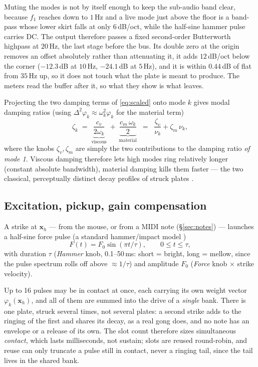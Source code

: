 \documentclass[11pt,a4paper]{article}
\newcommand{\bilap}{\Delta^2}
\begin{document}
Muting the modes is not by itself enough to keep the sub-audio band clear,
because $f_1$ reaches down to $1$\,Hz and a live mode just above the floor
is a band-pass whose lower skirt falls at only $6$\,dB/oct, while the
half-sine hammer pulse carries DC. The output therefore passes a fixed
second-order Butterworth highpass at $20$\,Hz, the last stage before the
bus. Its double zero at the origin removes an offset absolutely rather than
attenuating it, it adds $12$\,dB/oct below the corner ($-12.3$\,dB at
$10$\,Hz, $-24.1$\,dB at $5$\,Hz), and it is within $0.44$\,dB of flat from
$35$\,Hz up, so it does not touch what the plate is meant to produce. The
meters read the buffer after it, so what they show is what leaves.

Projecting the two damping terms of \eqref{eq:scaled} onto mode $k$ gives
modal damping ratios (using $\bilap \varphi_k \approx \omega_k^2 \varphi_k$
for the material term)
%
\begin{equation}
  \zeta_k \;=\; \underbrace{\frac{c_v}{2\omega_k}}_{\text{viscous}}
          \;+\; \underbrace{\frac{c_m\, \omega_k}{2}}_{\text{material}}
  \;\;=\;\; \frac{\zeta_v}{\nu_k} + \zeta_m\, \nu_k ,
  \label{eq:damping}
\end{equation}
%
where the knobs $\zeta_v, \zeta_m$ are simply the two contributions to the
damping ratio \emph{of mode 1}. Viscous damping therefore lets high modes
ring relatively longer (constant absolute bandwidth), material damping
kills them faster --- the two classical, perceptually distinct decay
profiles of struck plates \cite{chaigne,fletcher-rossing}.

\subsection{Excitation, pickup, gain compensation}
\label{sec:excitation}

A strike at $\bm{x}_h$ --- from the mouse, or from a MIDI note
(\S\ref{sec:notes}) --- launches a half-sine force pulse (a standard
hammer/impact model \cite{chaigne})
%
\begin{equation}
  F(t) = F_0 \sin\!\left(\pi t/\tau\right), \qquad 0 \le t \le \tau,
\end{equation}
%
with duration $\tau$ (\emph{Hammer} knob, 0.1--50\,ms: short = bright,
long = mellow, since the pulse spectrum rolls off above $\approx 1/\tau$)
and amplitude $F_0$ (\emph{Force} knob $\times$ strike velocity).

Up to 16 pulses may be in contact at once, each carrying its own weight
vector $\varphi_k(\bm{x}_h)$, and all of them are summed into the drive of
a \emph{single} bank. There is one plate, struck several times, not
several plates: a second strike adds to the ringing of the first and
shares its decay, as a real gong does, and no note has an envelope or a
release of its own. The slot count therefore sizes simultaneous
\emph{contact}, which lasts milliseconds, not sustain; slots are reused
round-robin, and reuse can only truncate a pulse still in contact, never a
ringing tail, since the tail lives in the shared bank.
\end{document}
